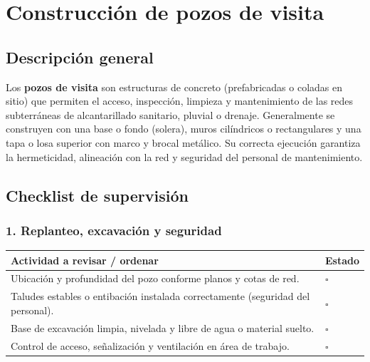 \documentclass[12pt]{article}
\newcommand{\cbox}{\(\square\)} %
\begin{document}
	
	
	
	
	
	\section{Construcción de pozos de visita}
	
	\subsection*{Descripción general}
	Los \textbf{pozos de visita} son estructuras de concreto (prefabricadas o coladas en sitio) que permiten el acceso, inspección, limpieza y mantenimiento de las redes subterráneas de alcantarillado sanitario, pluvial o drenaje.  
	Generalmente se construyen con una base o fondo (solera), muros cilíndricos o rectangulares y una tapa o losa superior con marco y brocal metálico.  
	Su correcta ejecución garantiza la hermeticidad, alineación con la red y seguridad del personal de mantenimiento.
	

	\subsection{Checklist de supervisión}
	
	\subsubsection*{1. Replanteo, excavación y seguridad}
	\begin{tabularx}{\linewidth}{>{\raggedright\arraybackslash}p{0.93\linewidth} >{\centering\arraybackslash}m{0.07\linewidth}}
		\toprule
		\textbf{Actividad a revisar / ordenar} & \textbf{Estado}\\
		\midrule
		Ubicación y profundidad del pozo conforme planos y cotas de red. & \cbox \\
		Taludes estables o entibación instalada correctamente (seguridad del personal). & \cbox \\
		Base de excavación limpia, nivelada y libre de agua o material suelto. & \cbox \\
		Control de acceso, señalización y ventilación en área de trabajo. & \cbox \\
		\bottomrule
	\end{tabularx}
	
\end{document}
